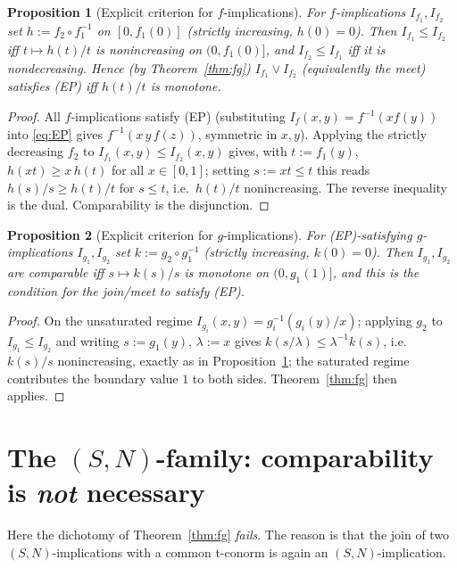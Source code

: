 \documentclass{amsart}
\theoremstyle{plain}
\newtheorem{proposition}{Proposition}
\theoremstyle{definition}
\begin{document}
\begin{proposition}[Explicit criterion for $f$-implications]\label{prop:f}
For $f$-implications $I_{f_1},I_{f_2}$ set $h:=f_2\circ f_1^{-1}$ on $[0,f_1(0)]$ (strictly
increasing, $h(0)=0$).  Then $I_{f_1}\le I_{f_2}$ iff $t\mapsto h(t)/t$ is nonincreasing on
$(0,f_1(0)]$, and $I_{f_2}\le I_{f_1}$ iff it is nondecreasing.  Hence (by
Theorem~\ref{thm:fg}) $I_{f_1}\vee I_{f_2}$ (equivalently the meet) satisfies
\textup{(EP)} iff $h(t)/t$ is monotone.
\end{proposition}

\begin{proof}
All $f$-implications satisfy (EP) (substituting $I_f(x,y)=f^{-1}(xf(y))$ into
\eqref{eq:EP} gives $f^{-1}(x\,y\,f(z))$, symmetric in $x,y$).  Applying the strictly
decreasing $f_2$ to $I_{f_1}(x,y)\le I_{f_2}(x,y)$ gives, with $t:=f_1(y)$,
$h(xt)\ge x\,h(t)$ for all $x\in[0,1]$; setting $s:=xt\le t$ this reads $h(s)/s\ge h(t)/t$
for $s\le t$, i.e.\ $h(t)/t$ nonincreasing.  The reverse inequality is the dual.
Comparability is the disjunction.
\end{proof}

\begin{proposition}[Explicit criterion for $g$-implications]\label{prop:g}
For \textup{(EP)}-satisfying $g$-implications $I_{g_1},I_{g_2}$ set $k:=g_2\circ g_1^{-1}$
(strictly increasing, $k(0)=0$).  Then $I_{g_1},I_{g_2}$ are comparable iff $s\mapsto
k(s)/s$ is monotone on $(0,g_1(1)]$, and this is the condition for the join/meet to satisfy
\textup{(EP)}.
\end{proposition}

\begin{proof}
On the unsaturated regime $I_{g_i}(x,y)=g_i^{-1}(g_i(y)/x)$; applying $g_2$ to
$I_{g_1}\le I_{g_2}$ and writing $s:=g_1(y)$, $\lambda:=x$ gives $k(s/\lambda)\le
\lambda^{-1}k(s)$, i.e.\ $k(s)/s$ nonincreasing, exactly as in
Proposition~\ref{prop:f}; the saturated regime contributes the boundary value $1$ to both
sides.  Theorem~\ref{thm:fg} then applies.
\end{proof}

\section{The $(S,N)$-family: comparability is \emph{not} necessary}\label{sec:SN}

Here the dichotomy of Theorem~\ref{thm:fg} \emph{fails}.  The reason is that the join of
two $(S,N)$-implications with a common t-conorm is again an $(S,N)$-implication.
\end{document}
